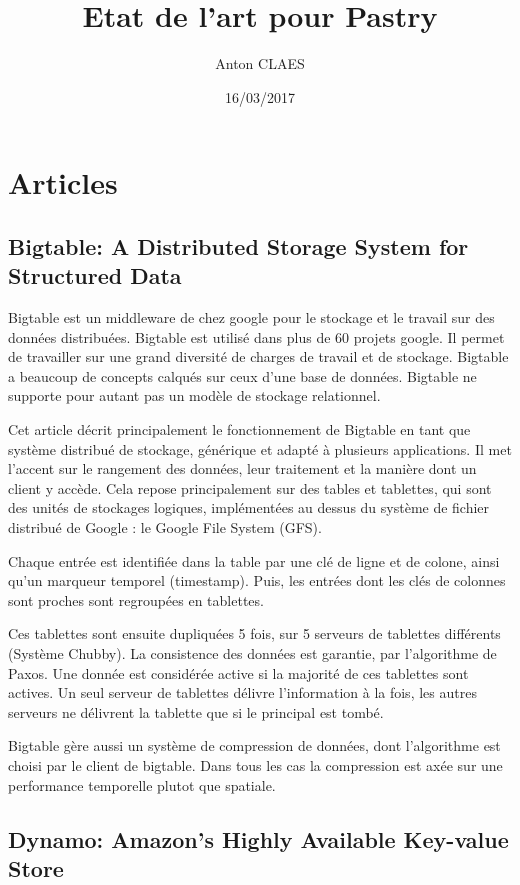 \documentclass{article}
\title{Etat de l'art pour Pastry}
\author{Anton CLAES}
\date{16/03/2017}
\begin{document}
\maketitle
\tableofcontents

\section{Articles}
\subsection{Bigtable: A Distributed Storage System for Structured Data
\cite{Chang:2008:BDS:1365815.1365816}
}

Bigtable est un middleware de chez google pour le stockage et le travail sur des données distribuées.
Bigtable est utilisé dans plus de 60 projets google. Il permet de travailler sur une grand diversité de charges de travail
et de stockage. Bigtable a beaucoup de concepts calqués sur ceux d'une base de données. Bigtable ne supporte pour autant
pas un modèle de stockage relationnel.

Cet article décrit principalement le fonctionnement de Bigtable en tant que système distribué de stockage, générique
et adapté à plusieurs applications. Il met l'accent sur le rangement des données, leur traitement et la manière dont
un client y accède. Cela repose principalement sur des tables et tablettes, qui sont des unités de stockages logiques,
implémentées au dessus du système de fichier distribué de Google : le Google File System (GFS).

Chaque entrée est identifiée dans la table par une clé de ligne et de colone, ainsi qu'un marqueur temporel (timestamp).
Puis, les entrées dont les clés de colonnes sont proches sont regroupées en tablettes.

Ces tablettes sont ensuite dupliquées 5 fois, sur 5 serveurs de tablettes différents (Système Chubby). La consistence des données
est garantie, par l'algorithme de Paxos. Une donnée est considérée active si la majorité de ces tablettes sont actives.
Un seul serveur de tablettes délivre l'information à la fois, les autres serveurs ne délivrent la tablette que si le principal
est tombé.

Bigtable gère aussi un système de compression de données, dont l'algorithme est choisi par le client de bigtable. Dans tous les
cas la compression est axée sur une performance temporelle plutot que spatiale.

\subsection{Dynamo: Amazon’s Highly Available Key-value Store
\cite{DeCandia:2007:DAH:1323293.1294281}
}
\end{document}
